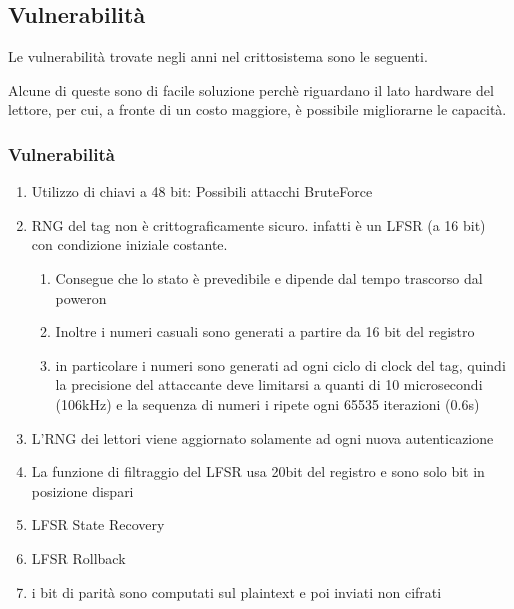 \subsection{Vulnerabilità}

\begin{frame}
    Le vulnerabilità trovate negli anni nel crittosistema sono le seguenti.

    Alcune di queste sono di facile soluzione perchè riguardano il lato hardware del lettore,
    per cui, a fronte di un costo maggiore, è possibile migliorarne le capacità.
\end{frame}

\begin{frame}
    \frametitle{Vulnerabilità}
    \scriptsize
    \begin{enumerate}
        \item <1-> Utilizzo di chiavi a 48 bit: Possibili attacchi BruteForce \cite{courtois2008algebraic}\label{enum:keylength}
        \item <2-> RNG del tag non è crittograficamente sicuro. infatti è un LFSR (a 16 bit)~\cite{garcia2008dismantling} con condizione iniziale costante.\label{enum:rng-16-bit}
        \begin{enumerate} \scriptsize
            \item <3-> Consegue che lo stato è prevedibile e dipende dal tempo trascorso dal poweron~\cite{garcia2008dismantling}\cite{courtois2008algebraic}\label{enum:rng-constant-seed}
            \item <4-> Inoltre i numeri casuali sono generati a partire da 16 bit del registro 
            \item <5-> in particolare i numeri sono generati ad ogni ciclo di clock del tag, quindi la precisione del attaccante deve limitarsi a quanti di 10 microsecondi (106kHz) e la sequenza di numeri i ripete ogni 65535 iterazioni (0.6s)
        \end{enumerate}
        \item <6-> L'RNG dei lettori viene aggiornato solamente ad ogni nuova autenticazione~\cite{garcia2008dismantling}\label{enum:rng-reader-update}
        \item <7-> La funzione di filtraggio del LFSR usa 20bit del registro e sono solo bit in posizione dispari
        \item <8-> LFSR State Recovery
        \item <9-> LFSR Rollback
        \item <10-> i bit di parità sono computati sul plaintext e poi inviati non cifrati
    \end{enumerate}
\end{frame}

